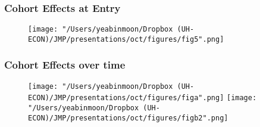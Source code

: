 \documentclass[11pt]{beamer}
\begin{document}
\begin{frame}
	\frametitle{Cohort Effects at Entry}
	\begin{figure}
		\centering
		\texttt{[image: "/Users/yeabinmoon/Dropbox (UH-ECON)/JMP/presentations/oct/figures/fig5".png]} 
	\end{figure}
	
\end{frame}


\begin{frame}
	\frametitle{Cohort Effects over time}
	\begin{figure}
		\centering
		\texttt{[image: "/Users/yeabinmoon/Dropbox (UH-ECON)/JMP/presentations/oct/figures/figa".png]} 
		\texttt{[image: "/Users/yeabinmoon/Dropbox (UH-ECON)/JMP/presentations/oct/figures/figb2".png]} 
	\end{figure}
	
\end{frame}
\end{document}
